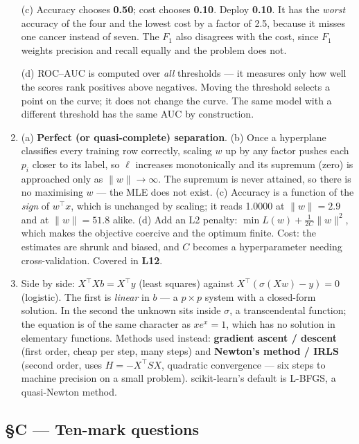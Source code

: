 \documentclass[11pt,a4paper]{article}
\newcommand{\A}[1]{\item[\textbf{#1}]}
\begin{document}
\begin{enumerate}[leftmargin=1.9cm]
\begin{answerbox}
(c) Accuracy chooses \textbf{0.50}; cost chooses \textbf{0.10}. Deploy
\textbf{0.10}. It has the \emph{worst} accuracy of the four and the lowest
cost by a factor of 2.5, because it misses one cancer instead of seven. The
$F_1$ also disagrees with the cost, since $F_1$ weights precision and recall
equally and the problem does not.

(d) ROC--AUC is computed over \emph{all} thresholds --- it measures only how
well the scores rank positives above negatives. Moving the threshold selects a
point on the curve; it does not change the curve. The same model with a
different threshold has the same AUC by construction.
\end{answerbox}

\A{U5.66} (a) \textbf{Perfect (or quasi-complete) separation}. (b) Once a
hyperplane classifies every training row correctly, scaling $w$ up by any
factor pushes each $p_i$ closer to its label, so $\ell$ increases
monotonically and its supremum (zero) is approached only as
$\|w\| \to \infty$. The supremum is never attained, so there is no maximising
$w$ --- the MLE does not exist. (c) Accuracy is a function of the \emph{sign}
of $w^\top x$, which is unchanged by scaling; it reads 1.0000 at
$\|w\| = 2.9$ and at $\|w\| = 51.8$ alike. (d) Add an L2 penalty:
$\min L(w) + \frac{1}{2C}\|w\|^2$, which makes the objective coercive and the
optimum finite. Cost: the estimates are shrunk and biased, and $C$ becomes a
hyperparameter needing cross-validation. Covered in \textbf{L12}.

\A{U5.67} Side by side:
$X^\top Xb = X^\top y$ (least squares) against
$X^\top(\sigma(Xw) - y) = 0$ (logistic). The first is \emph{linear} in $b$ ---
a $p\times p$ system with a closed-form solution. In the second the unknown
sits inside $\sigma$, a transcendental function; the equation is of the same
character as $xe^x = 1$, which has no solution in elementary functions.
Methods used instead: \textbf{gradient ascent / descent} (first order, cheap
per step, many steps) and \textbf{Newton's method / IRLS} (second order, uses
$H = -X^\top SX$, quadratic convergence --- six steps to machine precision on
a small problem). scikit-learn's default is L-BFGS, a quasi-Newton method.
\end{enumerate}

\subsection*{§C --- Ten-mark questions}
\end{document}
